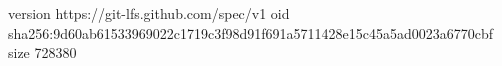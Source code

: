 version https://git-lfs.github.com/spec/v1
oid sha256:9d60ab61533969022c1719c3f98d91f691a5711428e15c45a5ad0023a6770cbf
size 728380
